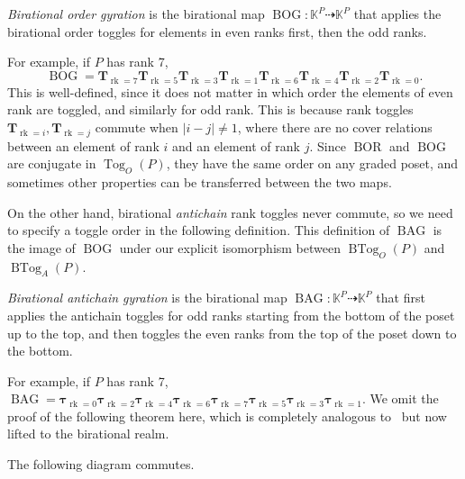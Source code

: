 \documentclass[ALCO,ThmDefs,Unicode,epreuves]{cedram}
\newcommand{\defn}[1]{\emph{#1}}
\newcommand{\kk}{\mathbb{K}}
\newcommand{\dra}{\dashrightarrow}
\newcommand{\up}{\Delta}
\DeclareMathOperator{\tog}{Tog}
\DeclareMathOperator{\btog}{BTog}
\DeclareMathOperator{\rk}{rk}
\DeclareMathOperator{\BAG}{BAG}
\DeclareMathOperator{\BOG}{BOG}
\DeclareMathOperator{\BOR}{BOR}
\newcommand{\rkT}[1]{\boldsymbol{T}_{\rk=#1}}
\newcommand{\rktau}[1]{\boldsymbol{\tau}_{\rk=#1}}
\begin{document}
\begin{defi}
\defn{Birational order gyration} is the birational map
$\BOG: \kk^P \dra \kk^P$ that applies the birational order toggles for elements in even ranks first, then the odd ranks.
\end{defi}

For example, if $P$ has rank 7,
\[
\BOG=\rkT{7}\rkT{5}\rkT{3}\rkT{1}\rkT{6}\rkT{4}\rkT{2}\rkT{0}.
\]
This is well-defined, since it does not matter in which order the elements of even rank are toggled, and similarly for odd rank.
This is because rank toggles $\rkT{i}, \rkT{j}$ commute when $|i-j|\not= 1$, where there are
no cover relations between an element of rank $i$ and an element of rank $j$. 
Since $\BOR$ and $\BOG$ are conjugate in $\tog_O(P)$,
they have the same order on any graded poset, and sometimes other properties can be transferred between the two maps.

On the other hand, birational \emph{antichain}
rank toggles never commute, so we need to specify a toggle order in the following definition.
This definition of $\BAG$ is the image of $\BOG$
under our explicit isomorphism between $\btog_O(P)$ and $\btog_A(P)$.

\begin{defi}
\defn{Birational antichain gyration} is the birational map
$\BAG:\kk^P \dra \kk^P$ that first applies the antichain toggles for odd ranks starting from the bottom of the poset
up to the top, and then toggles the even ranks from the top of the poset
down to the bottom.
\end{defi}

For example, if $P$ has rank 7,
$\BAG=\rktau{0}\rktau{2}\rktau{4}\rktau{6}\rktau{7}\rktau{5}\rktau{3}\rktau{1}$.
We omit the proof of the following theorem here, which is
completely analogous to~\cite[Theorem~2.34]{antichain-toggling} but now lifted to the birational realm.

\begin{theo}
The following diagram commutes.
\begin{center}
\end{center}
\end{theo}
\end{document}
